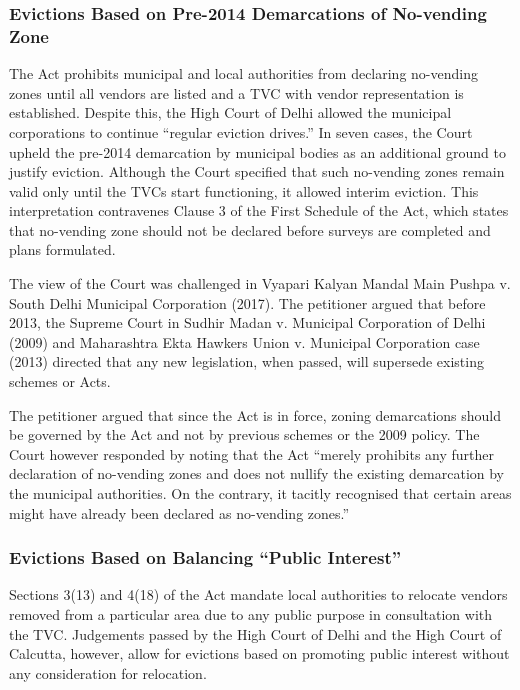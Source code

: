 \documentclass[a4paper, 12pt, twoside]{article}
\begin{document}
{\subsubsection*{Evictions Based on Pre-2014 Demarcations of No-vending Zone}

The Act prohibits municipal and local authorities from declaring no-vending zones until all vendors are listed and a TVC with vendor representation is established. Despite this, the High Court of Delhi allowed the municipal corporations to continue “regular eviction drives.” In seven cases, the Court upheld the pre-2014 demarcation by municipal bodies as an additional ground to justify eviction.  Although the Court specified that such no-vending zones remain valid only until the TVCs start functioning, it allowed interim eviction. This interpretation contravenes Clause 3 of the First Schedule of the Act, which states that no-vending zone should not be declared before surveys are completed and plans formulated.

The view of the Court was challenged in Vyapari Kalyan Mandal Main Pushpa v. South Delhi Municipal Corporation (2017). The petitioner argued that before 2013, the Supreme Court in Sudhir Madan v. Municipal Corporation of Delhi (2009) and Maharashtra Ekta Hawkers Union v. Municipal Corporation case (2013) directed that any new legislation, when passed, will supersede existing schemes or Acts.

The petitioner argued that since the Act is in force, zoning demarcations should be governed by the Act and not by previous schemes or the 2009 policy. The Court however responded by noting that the Act “merely prohibits any further declaration of no-vending zones and does not nullify the existing demarcation by the municipal authorities. On the contrary, it tacitly recognised that certain areas might have already been declared as no-vending zones.”

\subsubsection*{Evictions Based on Balancing “Public Interest”}

Sections 3(13) and 4(18) of the Act mandate local authorities to relocate vendors removed from a particular area due to any public purpose in consultation with the TVC. Judgements passed by the High Court of Delhi and the High Court of Calcutta, however, allow for evictions based on promoting public interest without any consideration for relocation.

}
\end{document}
